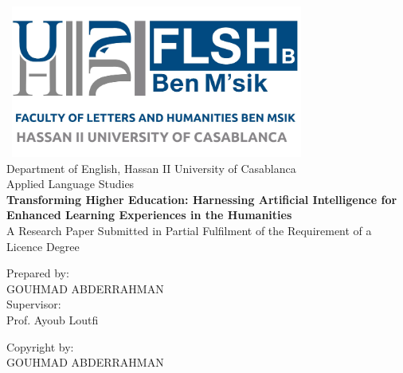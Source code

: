 \begin{titlepage}
  \centering
  \includegraphics[width=10cm, height=5cm]{./cover/univlogo.jpg} \\
  \centering
  Department of English, Hassan II University of Casablanca \\
  Applied Language Studies \\
  \vspace*{2cm}
  \textbf{\huge Transforming Higher Education: Harnessing Artificial Intelligence for Enhanced Learning Experiences in the Humanities} \\
  \vspace*{2cm}
  A Research Paper Submitted in Partial Fulfilment of the Requirement of a Licence Degree \\
  \vspace*{7cm}

  \begin{center}
    Prepared by:\\ GOUHMAD
    ABDERRAHMAN\\ Supervisor:\\
    Prof. Ayoub Loutfi \\
  \end{center}
  \newpage

  \vspace*{20cm}
  Copyright by:\\
  GOUHMAD ABDERRAHMAN

  \vspace*{\fill}
  \mydate
\end{titlepage}